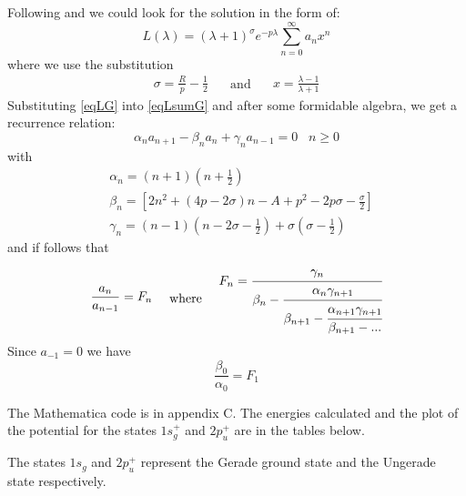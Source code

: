 Following \cite{Bates1} and \cite{H2Plus2d2} we could look for the solution in the form of:
\begin{equation}\label{eqLsumG}
L(\lambda) = \left(\lambda +1\right)^\sigma e^{-p\lambda}\sum_{n=0}^{\infty}{a_nx^n}
\end{equation}
where we use the substitution
\begin{equation}\label{eqLG}
\begin{split}
\sigma = \frac{R}{p} - \frac{1}{2}
\end{split}
\quad\text{ and }\quad
\begin{split}
x = \frac{\lambda-1}{\lambda+1}
\end{split}
\end{equation}
Substituting \eqref{eqLG} into \eqref{eqLsumG} and after some formidable algebra, we get a recurrence relation:
\begin{equation}
\alpha_na_{n+1}-\beta_n a_n+\gamma_na_{n-1} = 0\,\,\,\,\,n \ge 0
\end{equation}
with
\begin{equation}
\begin{split}
& \alpha_n = \left(n + 1\right)\left(n + \frac{1}{2}\right)\\[.8em]
& \beta_n = \left[2n^2 + (4p - 2\sigma)n - A + p^2 - 2p\sigma - \frac{\sigma}{2}\right] \\[.8em]
& \gamma_n = (n-1)\left(n - 2\sigma - \frac{1}{2}\right) + \sigma\left(\sigma - \frac{1}{2}\right)
\end{split}
\end{equation}
and if follows that
\begin{equation}
\begin{split}
\frac{a_n}{a_{n-1}} = F_n
\end{split}
\quad\text{ where }\quad
\begin{split}
F_n = \cfrac{\gamma_n}{\beta_n - \cfrac{\alpha_n \gamma_{n+1}}{\beta_{n+1}-\cfrac{\alpha_{n+1}\gamma_{n+1}}{\beta_{n+1}-\text{...}}}}
\end{split}
\end{equation}
Since $ a_{-1} = 0$ we have
\begin{equation}
\frac{\beta_0}{\alpha_0} = F_1
\end{equation}

The Mathematica code is in appendix C. The energies calculated and the plot of the potential for the states $1s_g^{+}$ and $ 2p_u^{+} $ are in the tables below.

The states  $ 1s_g $ and $ 2p_u^{+} $ represent the Gerade ground state and the Ungerade state respectively.


